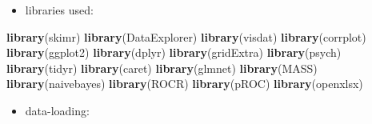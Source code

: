 \documentclass[
]{article}
\newenvironment{Shaded}{\begin{snugshade}}{\end{snugshade}}
\newcommand{\FunctionTok}[1]{\textcolor[rgb]{0.13,0.29,0.53}{\textbf{#1}}}
\newcommand{\NormalTok}[1]{#1}
\providecommand{\tightlist}{%
  \setlength{\itemsep}{0pt}\setlength{\parskip}{0pt}}
\begin{document}
\begin{itemize}
\tightlist
\item
  libraries used:
\end{itemize}

\begin{Shaded}
\begin{Highlighting}[]
\FunctionTok{library}\NormalTok{(skimr)}
\FunctionTok{library}\NormalTok{(DataExplorer)}
\FunctionTok{library}\NormalTok{(visdat)}
\FunctionTok{library}\NormalTok{(corrplot)}
\FunctionTok{library}\NormalTok{(ggplot2)}
\FunctionTok{library}\NormalTok{(dplyr)}
\FunctionTok{library}\NormalTok{(gridExtra)}
\FunctionTok{library}\NormalTok{(psych)}
\FunctionTok{library}\NormalTok{(tidyr)}
\FunctionTok{library}\NormalTok{(caret)}
\FunctionTok{library}\NormalTok{(glmnet)}
\FunctionTok{library}\NormalTok{(MASS)}
\FunctionTok{library}\NormalTok{(naivebayes)}
\FunctionTok{library}\NormalTok{(ROCR)}
\FunctionTok{library}\NormalTok{(pROC)}
\FunctionTok{library}\NormalTok{(openxlsx)}
\end{Highlighting}
\end{Shaded}

\begin{itemize}
\tightlist
\item
  data-loading:
\end{itemize}
\end{document}
